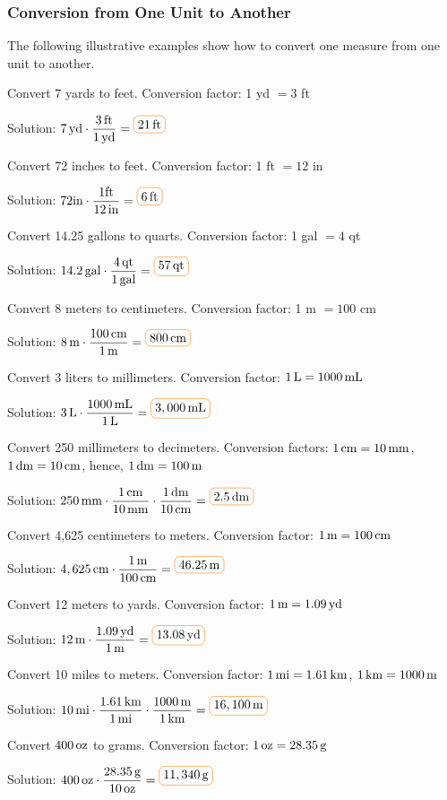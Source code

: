 \subsubsection*{Conversion from One Unit to Another}
The following illustrative examples show how to convert one measure from one unit to
another.
\begin{example}
\item Convert 7 yards to feet. Conversion factor: 1 yd $= 3$ ft

Solution: $7\yd\cdot \dfrac{3\ft}{1\yd}=\boxed{21\ft}$

\item Convert 72 inches to feet. Conversion factor: 1 ft $= 12$ in

Solution: $72\mathrm{in}\cdot\dfrac{1\mathrm{ft}}{12\IN}=\boxed{6\ft}$

\item Convert 14.25 gallons to quarts. Conversion factor: 1 gal $= 4$ qt

Solution: $14.2\gal\cdot\dfrac{4\qt}{1\gal}=\boxed{57\qt}$
\end{example}
\begin{example}
\item Convert 8 meters to centimeters. Conversion factor: 1 m $= 100$ cm

Solution: $8\m\cdot \dfrac{100\cm}{1\m}=\boxed{800\cm}$

\item Convert 3 liters to millimeters. Conversion factor: $1 \,\mathrm{L} = 1000 \,\mathrm{mL}$

Solution: $3\Li\cdot\dfrac{1000\mL}{1\Li}=\boxed{3,000\mL}$

\item Convert 250 millimeters to decimeters. Conversion factors: $1 \,\mathrm{cm} = 10 \,\mathrm{mm}$, $1\,\mathrm{dm} = 10
\,\mathrm{cm}$, hence, $1 \,\mathrm{dm} = 100 \,\mathrm{m}$

Solution: $250\mm\cdot\dfrac{1\cm}{10\mm}\cdot\dfrac{1\dm}{10\cm}=\boxed{2.5\dm}$

\item Convert 4,625 centimeters to meters. Conversion factor: $1 \,\mathrm{m} = 100 \,\mathrm{cm}$

Solution: $4,625\cm\cdot\dfrac{1\m}{100\cm}=\boxed{46.25\m}$
\end{example}

\begin{example}
\item Convert 12 meters to yards. Conversion factor: $1 \,\mathrm{m} = 1.09 \,\mathrm{yd}$

Solution: $12\m\cdot\dfrac{1.09\yd}{1\m}=\boxed{13.08\yd}$

\item Convert 10 miles to meters. Conversion factor: $1 \,\mathrm{mi} = 1.61 \,\mathrm{km}$, $1 \,\mathrm{km} = 1000 \,\mathrm{m}$

Solution: $10\mi\cdot\dfrac{1.61\km}{1\mi}\cdot\dfrac{1000\m}{1\km}=\boxed{16,100\m}$

\item Convert $400 \,\mathrm{oz}$ to grams. Conversion factor: $1 \,\mathrm{oz} = 28.35 \,\mathrm{g}$

Solution: $400\oz\cdot\dfrac{28.35\g}{10\oz}=\boxed{11,340\g}$
\end{example}

